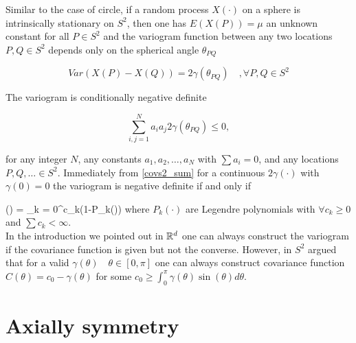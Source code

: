 	
	
	Similar to the case of circle, if a random process $X(\cdot)$ on a sphere is intrinsically stationary on $S^2$, then one has $E(X(P))=\mu$ an unknown constant for all $P\in S^2$ and the variogram function between any two locations $P, Q \in S^2$ depends only on the spherical angle $\theta_{PQ}$ 
	
	\[
	Var(X(P)-X(Q)) = 2\gamma(\theta_{PQ}) \quad , \forall P, Q \in S^2
	\]
	
The variogram is conditionally negative definite
	
	\[
	\sum_{i,j=1}^{N} a_i a_j 2\gamma(\theta_{PQ}) \le 0,
	\]
	
	for any integer $N$, any constants $a_1, a_2, \ldots, a_N$ with $\sum a_i = 0$, and any locations $P, Q, \ldots \in S^2$. Immediately from \ref{covs2_sum} for a continuous $2\gamma(\cdot)$ with $\gamma(0)=0$ the variogram is negative definite if and only if 
	
	\beq 
	\gamma(\theta) = \sum_{k = 0}^\infty c_k(1-P_k(\cos\theta))
	\eeq
	where $P_{k}(\cdot)$ are Legendre polynomials with $\forall c_k\ge 0$ and $\sum c_k < \infty$. \\
	
	In the introduction we pointed out in $\mathbb{R}^d$ one can always construct the variogram if the covariance function is given but not the converse. However, in $S^2$ \cite{Yaglom1961} argued that for a valid $\gamma(\theta) \quad \theta \in [0,\pi]$ one can always construct covariance function $C(\theta)=c_0-\gamma(\theta)$ for some $c_0 \ge \int_0^{\pi} \gamma(\theta)\sin(\theta)d\theta$. 
	

		\section{Axially symmetry}
			
